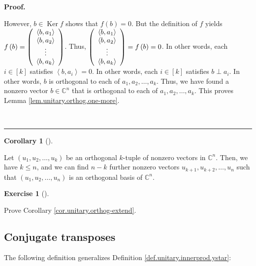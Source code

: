 \documentclass[numbers=enddot,12pt,final,onecolumn,notitlepage]{scrartcl}%
\newcounter{exer}
\numberwithin{exer}{subsection}
\theoremstyle{definition}
\newtheorem{coro}[theo]{Corollary}
\newenvironment{corollary}[1][]
{\begin{coro}[#1]\begin{leftbar}}
{\end{leftbar}\end{coro}}
\newtheorem{exmp}[exer]{Exercise}
\newenvironment{exercise}[1][]
{\begin{exmp}[#1]\begin{leftbar}}
{\end{leftbar}\end{exmp}}
\newenvironment{fineprint}{\medskip \begin{small}}{\end{small} \medskip}
\newenvironment{proof}[1][Proof]{\noindent\textbf{#1.} }{\ \rule{0.5em}{0.5em}}
\begin{document}
\begin{proof}
\begin{fineprint}
However, $b\in\operatorname*{Ker}f$ shows that $f\left(  b\right)  =0$. But
the definition of $f$ yields $f\left(  b\right)  =\left(
\begin{array}
[c]{c}%
\left\langle b,a_{1}\right\rangle \\
\left\langle b,a_{2}\right\rangle \\
\vdots\\
\left\langle b,a_{k}\right\rangle
\end{array}
\right)  $. Thus, $\left(
\begin{array}
[c]{c}%
\left\langle b,a_{1}\right\rangle \\
\left\langle b,a_{2}\right\rangle \\
\vdots\\
\left\langle b,a_{k}\right\rangle
\end{array}
\right)  =f\left(  b\right)  =0$. In other words, each $i\in\left[  k\right]
$ satisfies $\left\langle b,a_{i}\right\rangle =0$. In other words, each
$i\in\left[  k\right]  $ satisfies $b\perp a_{i}$. In other words, $b$ is
orthogonal to each of $a_{1},a_{2},\ldots,a_{k}$. Thus, we have found a
nonzero vector $b\in\mathbb{C}^{n}$ that is orthogonal to each of $a_{1}%
,a_{2},\ldots,a_{k}$. This proves Lemma \ref{lem.unitary.orthog.one-more}.
\end{fineprint}
\end{proof}

\begin{corollary}
\label{cor.unitary.orthog-extend}Let $\left(  u_{1},u_{2},\ldots,u_{k}\right)
$ be an orthogonal $k$-tuple of nonzero vectors in $\mathbb{C}^{n}$. Then, we
have $k\leq n$, and we can find $n-k$ further nonzero vectors $u_{k+1}%
,u_{k+2},\ldots,u_{n}$ such that $\left(  u_{1},u_{2},\ldots,u_{n}\right)  $
is an orthogonal basis of $\mathbb{C}^{n}$.
\end{corollary}

\begin{exercise}
\label{exe.unitary.orthog-extend} Prove Corollary
\ref{cor.unitary.orthog-extend}.
\end{exercise}

\subsection{Conjugate transposes}

The following definition generalizes Definition
\ref{def.unitary.innerprod.ystar}:
\end{document}

